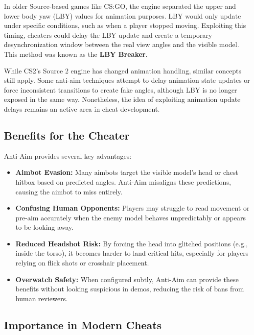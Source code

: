 In older Source-based games like CS:GO, the engine separated the upper and lower body yaw (LBY) values for animation purposes. LBY would only update under specific conditions, such as when a player stopped moving. Exploiting this timing, cheaters could delay the LBY update and create a temporary desynchronization window between the real view angles and the visible model. This method was known as the \textbf{LBY Breaker}.

While CS2’s Source 2 engine has changed animation handling, similar concepts still apply. Some anti-aim techniques attempt to delay animation state updates or force inconsistent transitions to create fake angles, although LBY is no longer exposed in the same way. Nonetheless, the idea of exploiting animation update delays remains an active area in cheat development.

\subsection{Benefits for the Cheater}

Anti-Aim provides several key advantages:

\begin{itemize}
    \item \textbf{Aimbot Evasion:} Many aimbots target the visible model's head or chest hitbox based on predicted angles. Anti-Aim misaligns these predictions, causing the aimbot to miss entirely.
    
    \item \textbf{Confusing Human Opponents:} Players may struggle to read movement or pre-aim accurately when the enemy model behaves unpredictably or appears to be looking away.
    
    \item \textbf{Reduced Headshot Risk:} By forcing the head into glitched positions (e.g., inside the torso), it becomes harder to land critical hits, especially for players relying on flick shots or crosshair placement.
    
    \item \textbf{Overwatch Safety:} When configured subtly, Anti-Aim can provide these benefits without looking suspicious in demos, reducing the risk of bans from human reviewers.
\end{itemize}

\subsection{Importance in Modern Cheats}

